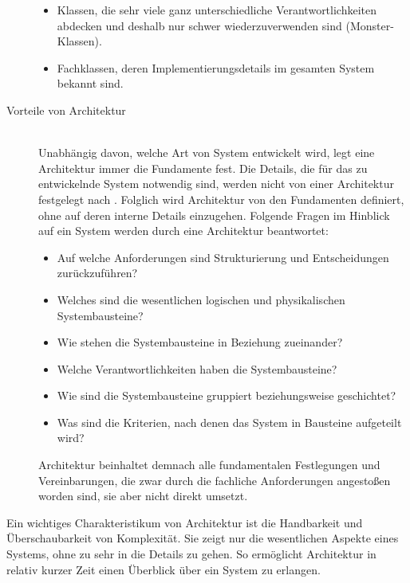 \begin{description}
\begin{itemize}
  \item Klassen, die sehr viele ganz unterschiedliche Verantwortlichkeiten abdecken und deshalb nur schwer wiederzuverwenden sind (\glqq Monster\grqq -Klassen).
  \item Fachklassen, deren Implementierungsdetails im gesamten System bekannt sind.
  \end{itemize}
\item[Vorteile von Architektur] \hfill \\
  Unabhängig davon, welche Art von System entwickelt wird, legt eine Architektur immer die Fundamente fest. Die Details, die für das zu entwickelnde System notwendig sind, werden nicht von einer Architektur festgelegt \citereset \autocite[siehe][]{Buschmann.1996} nach \citereset \autocite[siehe][S. 6-8]{Vogel.2009}. Folglich wird Architektur von den Fundamenten definiert, ohne auf deren interne Details einzugehen. Folgende Fragen im Hinblick auf ein System werden durch eine Architektur beantwortet:
  \begin{itemize}
  \item Auf welche Anforderungen sind Strukturierung und Entscheidungen zurückzuführen?
  \item Welches sind die wesentlichen logischen und physikalischen Systembausteine?
  \item Wie stehen die Systembausteine in Beziehung zueinander?
  \item Welche Verantwortlichkeiten haben die Systembausteine?
  \item Wie sind die Systembausteine gruppiert beziehungsweise geschichtet?
  \item Was sind die Kriterien, nach denen das System in Bausteine aufgeteilt wird?
  \end{itemize}
Architektur beinhaltet demnach alle fundamentalen Festlegungen und Vereinbarungen, die zwar durch die fachliche Anforderungen angestoßen worden sind, sie aber nicht direkt umsetzt.
\end{description}

Ein wichtiges Charakteristikum von Architektur ist die Handbarkeit und Überschaubarkeit von Komplexität. Sie zeigt nur die wesentlichen Aspekte eines Systems, ohne zu sehr in die Details zu gehen. So ermöglicht Architektur in relativ kurzer Zeit einen Überblick über ein System zu erlangen.

